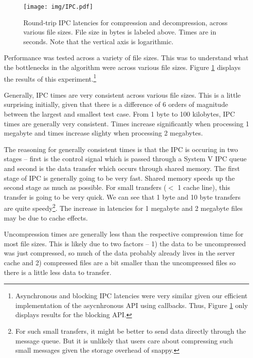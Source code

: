 \documentclass[paper=a4,fontsize=11pt]{report} %
\numberwithin{equation}{section} %
\numberwithin{figure}{section} %
\numberwithin{table}{section} %
\begin{document}
\begin{figure}[htb!]
  \texttt{[image: img/IPC.pdf]}
  \caption{Round-trip IPC latencies for compression and decompression, across various file sizes. File size in bytes is labeled above. Times are in seconds. Note that the vertical axis is logarithmic.}
  \label{ipc_time_chart}
\end{figure}

Performance was tested across a variety of file sizes. This was to understand what the bottlenecks in the algorithm were across various file sizes. Figure \ref{ipc_time_chart} displays the results of this experiment.\footnote{Asynchronous and blocking IPC latencies were very similar given our efficient implementation of the asycnhronous API using callbacks. Thus, Figure \ref{ipc_time_chart} only displays results for the blocking API.}

Generally, IPC times are very consistent across various file sizes. This is a little surprising initially, given that there is a difference of 6 orders of magnitude between the largest and smallest test case. From 1 byte to 100 kilobytes, IPC times are generally very consistent. Times increase significantly when processing 1 megabyte and times increase slighty when processing 2 megabytes.

The reasoning for generally consistent times is that the IPC is occuring in two stages -- first is the control signal which is passed through a System V IPC queue and second is the data transfer which occurs through shared memory. The first stage of IPC is generally going to be very fast. Shared memory speeds up the second stage as much as possible. For small transfers ($<$ 1 cache line), this transfer is going to be very quick. We can see that 1 byte and 10 byte transfers are quite speedy\footnote{For such small transfers, it might be better to send data directly through the message queue. But it is unlikely that users care about compressing such small messages given the storage overhead of snappy.}. The increase in latencies for 1 megabyte and 2 megabyte files may be due to cache effects.

Uncompression times are generally less than the respective compression time for most file sizes. This is likely due to two factors -- 1) the data to be uncompressed was just compressed, so much of the data probably already lives in the server cache and 2) compressed files are a bit smaller than the uncompressed files so there is a little less data to transfer.
\end{document}
